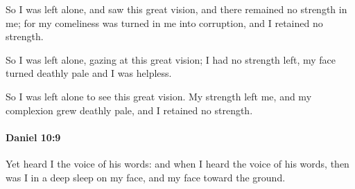			\begin{versebox}
					\item[BHS] 
					\item[LXX] 
					\item[ASV] So I was left alone, and saw this great vision, and there remained no strength in me; for my comeliness was turned in me into corruption, and I retained no strength.
					\item[NIV] So I was left alone, gazing at this great vision; I had no strength left, my face turned deathly pale and I was helpless.
					\item[NRSV] So I was left alone to see this great vision. My strength left me, and my complexion grew deathly pale, and I retained no strength.
			\end{versebox}

		\paragraph{Daniel 10:9} %
			\label{DANIEL-10-9}

			Yet heard I the voice of his words: and when I heard the voice of his words, then was I in a deep sleep on my face, and my face toward the ground.

